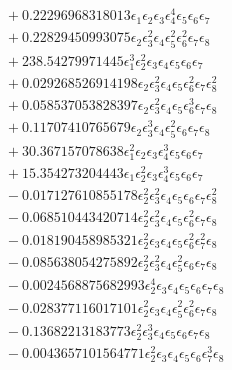 \documentclass[10pt]{article}
\begin{document}
\begin{align*}
&{}  + 0.22296968318013 \epsilon_{1} \epsilon_{2} \epsilon_{3} \epsilon_{4}^{4} \epsilon_{5} \epsilon_{6} \epsilon_{7} \\
&{}  + 0.22829450993075 \epsilon_{2} \epsilon_{3}^{2} \epsilon_{4} \epsilon_{5}^{2} \epsilon_{6}^{2} \epsilon_{7} \epsilon_{8} \\
&{}  + 238.54279971445 \epsilon_{1}^{3} \epsilon_{2}^{2} \epsilon_{3} \epsilon_{4} \epsilon_{5} \epsilon_{6} \epsilon_{7} \\
&{}  + 0.029268526914198 \epsilon_{2} \epsilon_{3}^{2} \epsilon_{4} \epsilon_{5} \epsilon_{6}^{2} \epsilon_{7} \epsilon_{8}^{2} \\
&{}  + 0.058537053828397 \epsilon_{2} \epsilon_{3}^{2} \epsilon_{4} \epsilon_{5} \epsilon_{6}^{3} \epsilon_{7} \epsilon_{8} \\
&{}  + 0.11707410765679 \epsilon_{2} \epsilon_{3}^{3} \epsilon_{4} \epsilon_{5}^{2} \epsilon_{6} \epsilon_{7} \epsilon_{8} \\
&{}  + 30.367157078638 \epsilon_{1}^{2} \epsilon_{2} \epsilon_{3} \epsilon_{4}^{3} \epsilon_{5} \epsilon_{6} \epsilon_{7} \\
&{}  + 15.354273204443 \epsilon_{1} \epsilon_{2}^{2} \epsilon_{3} \epsilon_{4}^{3} \epsilon_{5} \epsilon_{6} \epsilon_{7} \\
&{}  - 0.017127610855178 \epsilon_{2}^{2} \epsilon_{3}^{2} \epsilon_{4} \epsilon_{5} \epsilon_{6} \epsilon_{7} \epsilon_{8}^{2} \\
&{}  - 0.068510443420714 \epsilon_{2}^{2} \epsilon_{3}^{2} \epsilon_{4} \epsilon_{5} \epsilon_{6}^{2} \epsilon_{7} \epsilon_{8} \\
&{}  - 0.018190458985321 \epsilon_{2}^{2} \epsilon_{3} \epsilon_{4} \epsilon_{5} \epsilon_{6}^{2} \epsilon_{7}^{2} \epsilon_{8} \\
&{}  - 0.085638054275892 \epsilon_{2}^{2} \epsilon_{3}^{2} \epsilon_{4} \epsilon_{5}^{2} \epsilon_{6} \epsilon_{7} \epsilon_{8} \\
&{}  - 0.0024568875682993 \epsilon_{2}^{4} \epsilon_{3} \epsilon_{4} \epsilon_{5} \epsilon_{6} \epsilon_{7} \epsilon_{8} \\
&{}  - 0.028377116017101 \epsilon_{2}^{2} \epsilon_{3} \epsilon_{4} \epsilon_{5}^{2} \epsilon_{6}^{2} \epsilon_{7} \epsilon_{8} \\
&{}  - 0.13682213183773 \epsilon_{2}^{2} \epsilon_{3}^{3} \epsilon_{4} \epsilon_{5} \epsilon_{6} \epsilon_{7} \epsilon_{8} \\
&{}  - 0.0043657101564771 \epsilon_{2}^{2} \epsilon_{3} \epsilon_{4} \epsilon_{5} \epsilon_{6} \epsilon_{7}^{3} \epsilon_{8} \\

\end{align*}
\end{document}
